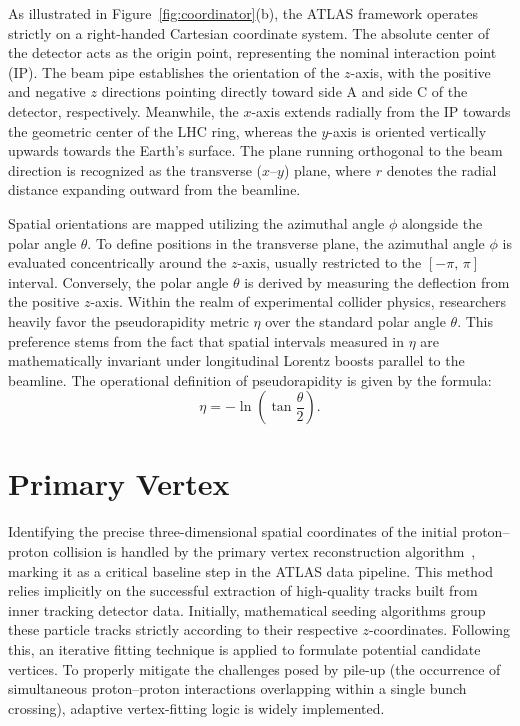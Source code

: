 As illustrated in Figure~\ref{fig:coordinator}(b), the ATLAS framework operates strictly on a right-handed Cartesian coordinate system. The absolute center of the detector acts as the origin point, representing the nominal interaction point (IP). The beam pipe establishes the orientation of the $z$-axis, with the positive and negative $z$ directions pointing directly toward side A and side C of the detector, respectively.
%
Meanwhile, the $x$-axis extends radially from the IP towards the geometric center of the LHC ring, whereas the $y$-axis is oriented vertically upwards towards the Earth's surface. The plane running orthogonal to the beam direction is recognized as the transverse ($x$--$y$) plane, where $r$ denotes the radial distance expanding outward from the beamline.

Spatial orientations are mapped utilizing the azimuthal angle $\phi$ alongside the polar angle $\theta$. To define positions in the transverse plane, the azimuthal angle $\phi$ is evaluated concentrically around the $z$-axis, usually restricted to the $[-\pi,\,\pi]$ interval. Conversely, the polar angle $\theta$ is derived by measuring the deflection from the positive $z$-axis.
%
Within the realm of experimental collider physics, researchers heavily favor the pseudorapidity metric $\eta$ over the standard polar angle $\theta$. This preference stems from the fact that spatial intervals measured in $\eta$ are mathematically invariant under longitudinal Lorentz boosts parallel to the beamline. The operational definition of pseudorapidity is given by the formula:
\begin{equation}
\eta = -\ln\left(\tan\frac{\theta}{2}\right).
\end{equation}

\section{Primary Vertex}

Identifying the precise three-dimensional spatial coordinates of the initial proton--proton collision is handled by the primary vertex reconstruction algorithm~\cite{ATLAS-PrimaryVertex-2017}, marking it as a critical baseline step in the ATLAS data pipeline. This method relies implicitly on the successful extraction of high-quality tracks built from inner tracking detector data. Initially, mathematical seeding algorithms group these particle tracks strictly according to their respective $z$-coordinates. Following this, an iterative fitting technique is applied to formulate potential candidate vertices. To properly mitigate the challenges posed by pile-up (the occurrence of simultaneous proton--proton interactions overlapping within a single bunch crossing), adaptive vertex-fitting logic is widely implemented.

